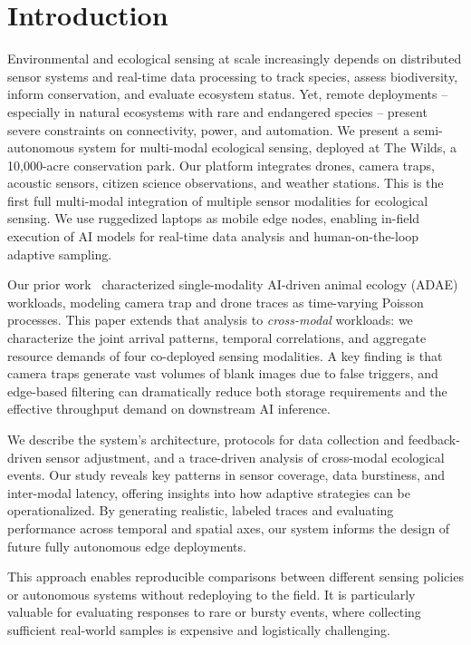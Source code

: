 \documentclass[letterpaper,twocolumn,10pt]{article}
\begin{document}
\tableofcontents

\newpage


\section{Introduction}


Environmental and ecological sensing at scale increasingly depends on distributed sensor systems and real-time data processing to track species, assess biodiversity, inform conservation, and evaluate ecosystem status. Yet, remote deployments -- especially in natural ecosystems with rare and endangered species -- present severe constraints on connectivity, power, and automation. We present a semi-autonomous system for multi-modal ecological sensing, deployed at The Wilds, a 10,000-acre conservation park. Our platform integrates drones, camera traps, acoustic sensors, citizen science observations, and weather stations. This is the first full multi-modal integration of multiple sensor modalities for ecological sensing. We use ruggedized laptops as mobile edge nodes, enabling in-field execution of AI models for real-time data analysis and human-on-the-loop adaptive sampling.

Our prior work~\cite{kline2024characterizing} characterized single-modality AI-driven animal ecology (ADAE) workloads, modeling camera trap and drone traces as time-varying Poisson processes. This paper extends that analysis to \textit{cross-modal} workloads: we characterize the joint arrival patterns, temporal correlations, and aggregate resource demands of four co-deployed sensing modalities. A key finding is that camera traps generate vast volumes of blank images due to false triggers, and edge-based filtering can dramatically reduce both storage requirements and the effective throughput demand on downstream AI inference.

We describe the system’s architecture, protocols for data collection and feedback-driven sensor adjustment, and a trace-driven analysis of cross-modal ecological events. Our study reveals key patterns in sensor coverage, data burstiness, and inter-modal latency, offering insights into how adaptive strategies can be operationalized. By generating realistic, labeled traces and evaluating performance across temporal and spatial axes, our system informs the design of future fully autonomous edge deployments.

This approach enables reproducible comparisons between different sensing policies or autonomous systems without redeploying to the field. It is particularly valuable for evaluating responses to rare or bursty events, where collecting sufficient real-world samples is expensive and logistically challenging.
\end{document}
